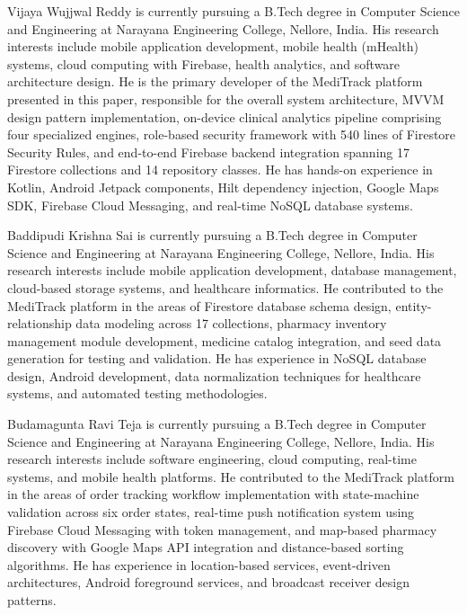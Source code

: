 \documentclass[journal,onecolumn,web]{ieeecolor}
\begin{document}
\begin{IEEEbiographynophoto}{Vijaya Wujjwal Reddy}
is currently pursuing a B.Tech degree in Computer
Science and Engineering at Narayana Engineering
College, Nellore, India. His research interests
include mobile application development, mobile health
(mHealth) systems, cloud computing with Firebase,
health analytics, and software architecture design.
He is the primary developer of the MediTrack platform
presented in this paper, responsible for the overall
system architecture, MVVM design pattern implementation,
on-device clinical analytics pipeline comprising four
specialized engines, role-based security framework
with 540 lines of Firestore Security Rules, and
end-to-end Firebase backend integration spanning 17
Firestore collections and 14 repository classes. He
has hands-on experience in Kotlin, Android Jetpack
components, Hilt dependency injection, Google Maps
SDK, Firebase Cloud Messaging, and real-time NoSQL
database systems.
\end{IEEEbiographynophoto}

\begin{IEEEbiographynophoto}{Baddipudi Krishna Sai}
is currently pursuing a B.Tech degree in Computer
Science and Engineering at Narayana Engineering
College, Nellore, India. His research interests
include mobile application development, database
management, cloud-based storage systems, and healthcare
informatics. He contributed to the MediTrack platform
in the areas of Firestore database schema design,
entity-relationship data modeling across 17 collections,
pharmacy inventory management module development,
medicine catalog integration, and seed data generation
for testing and validation. He has experience in
NoSQL database design, Android development, data
normalization techniques for healthcare systems,
and automated testing methodologies.
\end{IEEEbiographynophoto}

\begin{IEEEbiographynophoto}{Budamagunta Ravi Teja}
is currently pursuing a B.Tech degree in Computer
Science and Engineering at Narayana Engineering
College, Nellore, India. His research interests
include software engineering, cloud computing,
real-time systems, and mobile health platforms. He
contributed to the MediTrack platform in the areas
of order tracking workflow implementation with
state-machine validation across six order states,
real-time push notification system using Firebase
Cloud Messaging with token management, and map-based
pharmacy discovery with Google Maps API integration
and distance-based sorting algorithms. He has
experience in location-based services, event-driven
architectures, Android foreground services, and
broadcast receiver design patterns.
\end{IEEEbiographynophoto}
\end{document}
